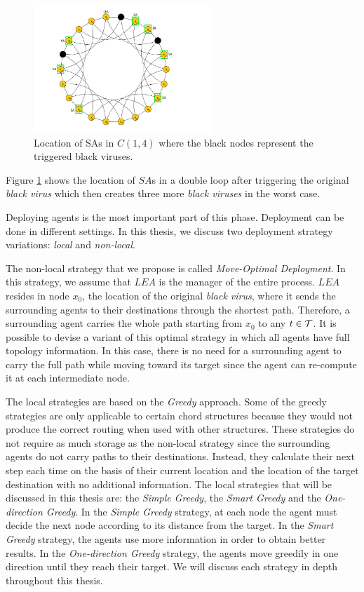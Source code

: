 \begin{figure}[H]
  \centering  
  \includegraphics[width=0.6\textwidth]{figures/dloop_ph2.jpg}
  \caption{Location of SAs in  $C(1,4)$ where the black nodes represent the triggered black viruses.}\label{fig:second phase}
\end{figure}

Figure \ref{fig:second phase} shows the location of $SA$s  in a double loop after triggering the original {\it black virus} which then creates three more {\it black viruses} in the worst case.


Deploying agents is the most important part of this phase. Deployment can be done in different settings. In this thesis, we discuss two deployment strategy variations: {\em local} and {\em non-local}.

The non-local strategy that we propose  is called {\em Move-Optimal Deployment}. In this strategy, we assume that $LEA$ is the manager of the entire process. $LEA$ resides in node $x_0$, the location of the original {\it black virus}, where it sends the surrounding agents to their destinations through the shortest path.
Therefore, a surrounding agent carries the whole path starting from $x_0$ to any $t \in \cal T$. It is possible to devise a variant of this optimal strategy in which all agents have full topology information. In this case, there is no need for a surrounding agent to carry the full path while moving toward its target since the agent can re-compute it at each intermediate node. 
 
The local strategies are based on the {\em Greedy} approach.  Some of the greedy strategies are only applicable to certain  chord structures  because  they would not produce the correct routing when used with other structures. These strategies do not require as much storage as the non-local strategy since the surrounding agents do not carry paths to their destinations. Instead, they calculate their next step each time on the basis of their current location and the location of the target destination with no additional information. The local strategies that will be discussed in this thesis are: the {\it Simple Greedy}, the {\em Smart Greedy} and the {\em One-direction Greedy}.
In the {\it Simple Greedy} strategy, at each node the agent must decide the next node according to its distance from the target. In the {\em Smart Greedy} strategy,  the agents use more information in order to obtain better results. In the {\em One-direction Greedy} strategy, the agents move greedily in one direction until they reach their target. We will discuss each strategy in depth throughout this thesis. 



